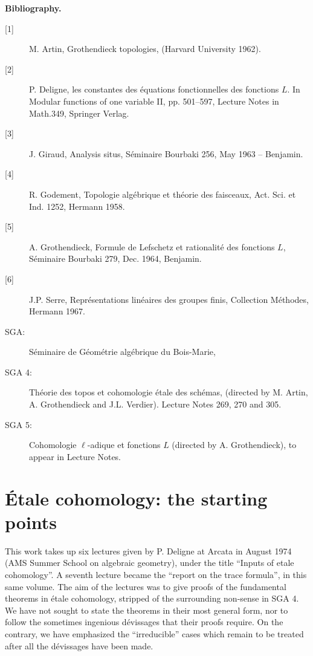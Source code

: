 \begin{center}\textbf{Bibliography.}\end{center}
\begin{description}
\item[{[1]}] M. Artin, Grothendieck topologies, (Harvard University 1962).
\item[{[2]}] P. Deligne, les constantes des équations fonctionnelles des
fonctions $L$. In Modular functions of one variable II, pp. 501--597, Lecture
Notes in Math.349, Springer Verlag.
\item[{[3]}] J. Giraud, Analysis situs, Séminaire Bourbaki 256, May 1963 -- Benjamin.
\item[{[4]}] R. Godement, Topologie algébrique et théorie des faisceaux,
Act. Sci. et Ind. 1252, Hermann 1958.
\item[{[5]}] A. Grothendieck, Formule de Lefschetz et rationalité des fonctions
$L$, Séminaire Bourbaki 279, Dec. 1964, Benjamin.
\item[{[6]}] J.P. Serre, Représentations linéaires des groupes finis,
Collection Méthodes, Hermann 1967.
\end{description}
\begin{description}
\item[SGA:] Séminaire de Géométrie algébrique du Bois-Marie,
\item[SGA 4:] Théorie des topos et cohomologie étale des schémas,
(directed by M. Artin, A. Grothendieck and J.L. Verdier).
Lecture Notes 269, 270 and 305.
\item[SGA 5:] Cohomologie $\ell$-adique et fonctions $L$
(directed by A. Grothendieck), to appear in Lecture Notes.
\end{description}



\chapter{Étale cohomology: the starting points}\label{I}

This work takes up six lectures given by P. Deligne at Arcata in August 1974
(AMS Summer School on algebraic geometry), under the title ``Inputs of etale
cohomology''. A seventh lecture became the ``report on the trace formula'',
in this same volume. The aim of the lectures was to give proofs of the
fundamental theorems in étale cohomology, stripped of the surrounding
non-sense in SGA 4. We have not sought to state the theorems in their most
general form, nor to follow the sometimes ingenious dévissages that their
proofs require. On the contrary, we have emphasized the ``irreducible''
cases which remain to be treated after all the dévissages have been made.


